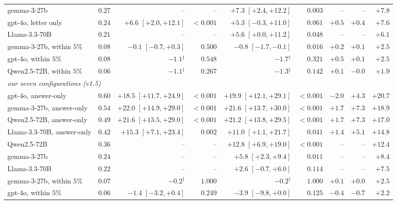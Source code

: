 \documentclass{article}
\begin{document}
\begin{table}[htbp]
{\begin{tabular}{lrrrrrrrr}
gemma-3-27b & $0.27$ & -- & -- & $+7.3$ {\scriptsize$[+2.4,+12.2]$} & $0.003$ & -- & -- & $+7.8$\\
gpt-4o, letter only & $0.24$ & $+6.6$ {\scriptsize$[+2.0,+12.1]$} & $<0.001$ & $+5.3$ {\scriptsize$[-0.3,+11.0]$} & $0.061$ & $+0.5$ & $+0.4$ & $+7.6$\\
Llama-3.3-70B & $0.21$ & -- & -- & $+5.6$ {\scriptsize$[+0.0,+11.2]$} & $0.048$ & -- & -- & $+6.1$\\
gemma-3-27b, within $5\%$ & $0.08$ & $-0.1$ {\scriptsize$[-0.7,+0.3]$} & $0.500$ & $-0.8$ {\scriptsize$[-1.7,-0.1]$} & $0.016$ & $+0.2$ & $+0.1$ & $+2.5$\\
gpt-4o, within $5\%$ & $0.08$ & $-1.1$$^{\ddagger}$ & $0.548$ & $-1.7$$^{\ddagger}$ & $0.321$ & $+0.5$ & $+0.1$ & $+2.5$\\
Qwen2.5-72B, within $5\%$ & $0.06$ & $-1.1$$^{\ddagger}$ & $0.267$ & $-1.3$$^{\ddagger}$ & $0.142$ & $+0.1$ & $-0.0$ & $+1.9$\\
\multicolumn{9}{l}{\emph{our seven configurations (v1.5)}}\\
gpt-4o, answer-only & $0.60$ & $+18.5$ {\scriptsize$[+11.7,+24.9]$} & $<0.001$ & $+19.9$ {\scriptsize$[+12.1,+29.1]$} & $<0.001$ & $-2.0$ & $+4.3$ & $+20.7$\\
gemma-3-27b, answer-only & $0.54$ & $+22.0$ {\scriptsize$[+14.9,+29.0]$} & $<0.001$ & $+21.6$ {\scriptsize$[+13.7,+30.0]$} & $<0.001$ & $+1.7$ & $+7.3$ & $+18.9$\\
Qwen2.5-72B, answer-only & $0.49$ & $+21.6$ {\scriptsize$[+13.5,+29.0]$} & $<0.001$ & $+21.2$ {\scriptsize$[+13.8,+29.5]$} & $<0.001$ & $+1.7$ & $+7.3$ & $+17.0$\\
Llama-3.3-70B, answer-only & $0.42$ & $+15.3$ {\scriptsize$[+7.1,+23.4]$} & $0.002$ & $+11.0$ {\scriptsize$[+1.1,+21.7]$} & $0.041$ & $+1.4$ & $+5.1$ & $+14.8$\\
Qwen2.5-72B & $0.36$ & -- & -- & $+12.8$ {\scriptsize$[+6.9,+19.0]$} & $<0.001$ & -- & -- & $+12.4$\\
gemma-3-27b & $0.24$ & -- & -- & $+5.8$ {\scriptsize$[+2.3,+9.4]$} & $0.011$ & -- & -- & $+8.4$\\
Llama-3.3-70B & $0.22$ & -- & -- & $+2.6$ {\scriptsize$[-0.7,+6.0]$} & $0.114$ & -- & -- & $+7.5$\\
gemma-3-27b, within $5\%$ & $0.07$ & $-0.2$$^{\ddagger}$ & $1.000$ & $-0.2$$^{\ddagger}$ & $1.000$ & $+0.1$ & $+0.0$ & $+2.5$\\
gpt-4o, within $5\%$ & $0.06$ & $-1.4$ {\scriptsize$[-3.2,+0.4]$} & $0.249$ & $-3.9$ {\scriptsize$[-9.8,+0.0]$} & $0.125$ & $-0.4$ & $-0.7$ & $+2.2$\\

\end{tabular}}
\end{table}
\end{document}
